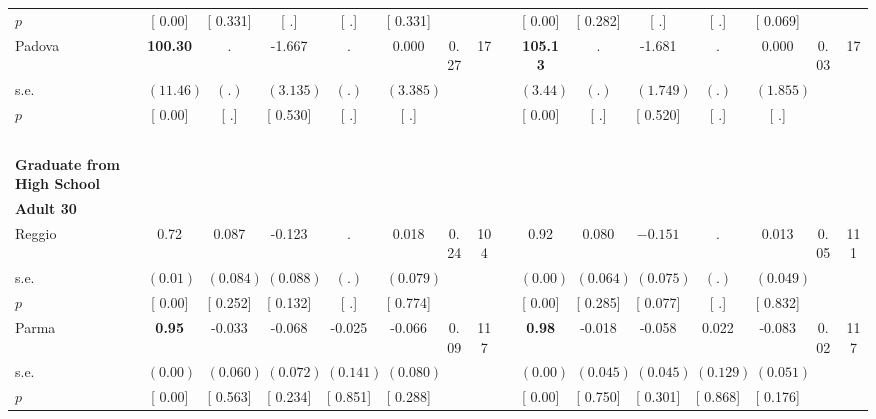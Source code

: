 \begin{longtable}{L{8em} c c c c c c c p{1em} c c c c c c c}
\quad \quad \quad \quad $ p$ & [     0.00] & [    0.331] & [        .] & [        .] & [    0.331] & & & & [     0.00] & [    0.282] & [        .] & [        .] & [    0.069] & &  \\[1em]
\quad \quad \quad Padova& \textbf{   100.30} &         . &    -1.667 &         . &     0.000 &      0.27 &        17 & & \textbf{   105.13} &         . &    -1.681 &         . &     0.000 &      0.03 &        17  \\*
\quad \quad \quad \quad s.e.& $ (    11.46)$ & $ (        .)$ & $ (    3.135)$ & $ (        .)$ & $ (    3.385)$ & & & & $ (     3.44)$ & $ (        .)$ & $ (    1.749)$ & $ (        .)$ & $ (    1.855)$ & &  \\*
\quad \quad \quad \quad $ p$ & [     0.00] & [        .] & [    0.530] & [        .] & [        .] & & & & [     0.00] & [        .] & [    0.520] & [        .] & [        .] & &  \\[1em]
~\\[1em]
\textbf{Graduate from High School} \\*
\quad \quad \textbf{Adult 30} & & & & & & & & & & & & & & & \\* 
\quad \quad \quad Reggio& 0.72 &     0.087 &    -0.123 &         . &     0.018 &      0.24 &       104 & & 0.92 &     0.080 & $ \mathbf{   -0.151}$ &         . &     0.013 &      0.05 &       111  \\*
\quad \quad \quad \quad s.e.& $ (     0.01)$ & $ (    0.084)$ & $ (    0.088)$ & $ (        .)$ & $ (    0.079)$ & & & & $ (     0.00)$ & $ (    0.064)$ & $ (    0.075)$ & $ (        .)$ & $ (    0.049)$ & &  \\*
\quad \quad \quad \quad $ p$ & [     0.00] & [    0.252] & [    0.132] & [        .] & [    0.774] & & & & [     0.00] & [    0.285] & [    0.077] & [        .] & [    0.832] & &  \\[1em]
\quad \quad \quad Parma& \textbf{     0.95} &    -0.033 &    -0.068 &    -0.025 &    -0.066 &      0.09 &       117 & & \textbf{     0.98} &    -0.018 &    -0.058 &     0.022 &    -0.083 &      0.02 &       117  \\*
\quad \quad \quad \quad s.e.& $ (     0.00)$ & $ (    0.060)$ & $ (    0.072)$ & $ (    0.141)$ & $ (    0.080)$ & & & & $ (     0.00)$ & $ (    0.045)$ & $ (    0.045)$ & $ (    0.129)$ & $ (    0.051)$ & &  \\*
\quad \quad \quad \quad $ p$ & [     0.00] & [    0.563] & [    0.234] & [    0.851] & [    0.288] & & & & [     0.00] & [    0.750] & [    0.301] & [    0.868] & [    0.176] & &  \\[1em]

\end{longtable}
